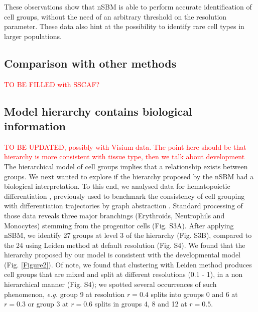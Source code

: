 \documentclass[10pt]{article}
\begin{document}
These observations show that nSBM is able to perform accurate identification of cell groups, without the need of an arbitrary threshold on the resolution parameter. These data also hint at the possibility to identify rare cell types in larger populations.

\subsection*{Comparison with other methods}

\textcolor{red}{TO BE FILLED with SSCAF?}


\subsection*{Model hierarchy contains biological information}

\textcolor{red}{TO BE UPDATED, possibly with Visium data. The point here should be that hierarchy is more consistent with tissue type, then we talk about development}
The hierarchical model of cell groups implies that a relationship exists between groups. We next wanted to explore if the hierarchy proposed by the nSBM had a biological interpretation. To this end, we analysed data for hematopoietic differentiation \cite{paul_2015}, previously used to benchmark the consistency of cell grouping with differentiation trajectories by graph abstraction \cite{wolf_2019}. Standard processing of those data reveals three major branchings (Erythroids, Neutrophils and Monocytes) stemming from the progenitor cells (Fig. S3A). After applying nSBM, we identify 27 groups at level 3 of the hierarchy (Fig. S3B), compared to the 24 using Leiden method at default resolution (Fig. S4). We found that the hierarchy proposed by our model is consistent with the developmental model (Fig. \ref{Figure2}). Of note, we found that clustering with Leiden method produces cell groups that are mixed and split at different resolutions (0.1 - 1), in a non hierarchical manner (Fig. S4); we spotted several occurrences of such phenomenon, \emph{e.g.} group 9 at resolution $r=0.4$ splits into groups 0 and 6 at $r=0.3$ or group 3 at $r=0.6$ splits in groups 4, 8 and 12 at $r=0.5$.
\end{document}
